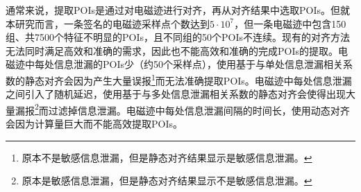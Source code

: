 {{{	
%	
%	
}
	
	通常来说，提取POIs是通过对电磁迹进行对齐，再从对齐结果中选取POIs。但就本研究而言，一条签名的电磁迹采样点个数达到$5\cdot10^{7}$，但一条电磁迹中包含150组、共7500个特征不明显的POIs，且不同组的50个POIs不连续。现有的对齐方法无法同时满足高效和准确的需求，因此也不能高效和准确的完成POIs的提取。电磁迹中每处信息泄漏的POIs少（约50个采样点），使用基于与单处信息泄漏相关系数的静态对齐会因为产生大量误报\footnote{原本不是敏感信息泄漏，但是静态对齐结果显示是敏感信息泄漏。}而无法准确提取POIs。电磁迹中每处信息泄漏之间引入了随机延迟，使用基于与多处信息泄漏相关系数的静态对齐会使得出现大量漏报\footnote{原本是敏感信息泄漏，但是静态对齐结果显示不是敏感信息泄漏。}而过滤掉信息泄漏。电磁迹中每处信息泄漏间隔的时间长，使用动态对齐会因为计算量巨大而不能高效提取POIs。
	
}}
